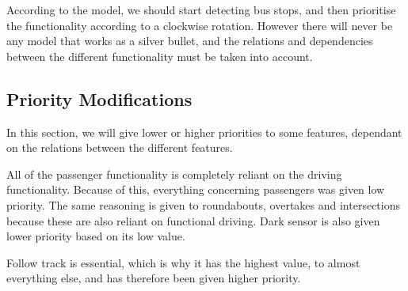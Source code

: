 According to the model, we should start detecting bus stops, and then prioritise the functionality according to a clockwise rotation. However there will never be any model that works as a silver bullet, and the relations and dependencies between the different functionality must be taken into account.  

\subsection{Priority Modifications}

In this section, we will give lower or higher priorities to some features, dependant on the relations between the different features.

All of the passenger functionality is completely reliant on the driving functionality. Because of this, everything concerning passengers was given low priority. The same reasoning is given to roundabouts, overtakes and intersections because these are also reliant on functional driving. Dark sensor is also given lower priority based on its low value.

Follow track is essential, which is why it has the highest value, to almost everything else, and has therefore been given higher priority.

